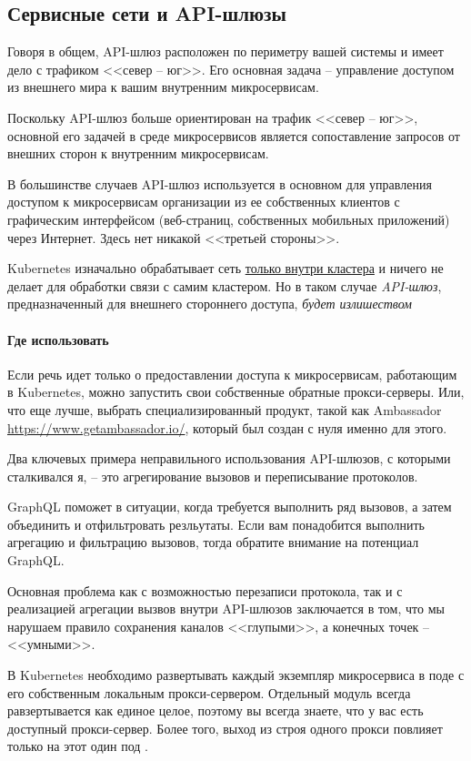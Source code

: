 \documentclass[%
	11pt,
	a4paper,
	utf8,
		]{article}
\begin{document}
\subsection{Сервисные сети и API-шлюзы}

Говоря в общем, API-шлюз расположен по периметру вашей системы и имеет дело с трафиком <<север -- юг>>. Его основная задача -- управление доступом из внешнего мира к вашим внутренним микросервисам. 

Поскольку API-шлюз больше ориентирован на трафик <<север -- юг>>, основной его задачей в среде микросервисов является сопоставление запросов от внешних сторон к внутренним микросервисам. 

В большинстве случаев API-шлюз используется в основном для управления доступом к микросервисам организации из ее собственных клиентов с графическим интерфейсом (веб-страниц, собственных мобильных приложений) через Интернет. Здесь нет никакой <<третьей стороны>>.

{\color{red}Kubernetes изначально обрабатывает сеть \underline{только внутри кластера} и ничего не делает для обработки связи с самим кластером. Но в таком случае \emph{API-шлюз}, предназначенный для внешнего стороннего доступа, \emph{будет излишеством}}

\paragraph{Где использовать} Если речь идет только о предоставлении доступа к микросервисам, работающим в Kubernetes, можно запустить свои собственные обратные прокси-серверы. Или, что еще лучше, выбрать специализированный продукт, такой как Ambassador \url{https://www.getambassador.io/}, который был создан с нуля именно для этого.

Два ключевых примера неправильного использования API-шлюзов, с которыми сталкивался я, -- это агрегирование вызовов и переписывание протоколов.

GraphQL поможет в ситуации, когда требуется выполнить ряд вызовов, а затем объединить и отфильтровать резльутаты. Если вам понадобится выполнить агрегацию и фильтрацию вызовов, тогда обратите внимание на потенциал GraphQL.

Основная проблема как с возможностью перезаписи протокола, так и с реализацией агрегации вызвов внутри API-шлюзов заключается в том, что мы нарушаем правило сохранения каналов <<глупыми>>, а конечных точек -- <<умными>>.

В Kubernetes необходимо развертывать каждый экземпляр микросервиса в поде с его собственным локальным прокси-сервером. Отдельный модуль всегда равзертывается как единое целое, поэтому вы всегда знаете, что у вас есть доступный прокси-сервер. Более того, выход из строя одного прокси повлияет только на этот один под \cite[]{microservices-2024}.
\end{document}
